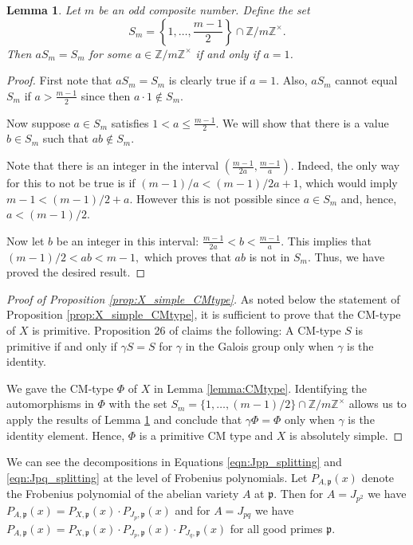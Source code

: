 \documentclass[reqno, oneside, 12pt]{amsart}
\newcommand{\Z}{\mathbb{Z}}
\newtheorem{lemma}[theorem]{Lemma}
\theoremstyle{remark}
\numberwithin{equation}{section}
\begin{document}
\begin{lemma}\label{lemma:primitive}
Let $m$ be an odd composite number. Define the set 
$$S_m=\left\{1,\ldots, \frac{m-1}{2}\right\} \cap \Z/m\Z^\times.$$
Then $aS_m=S_m$ for some $a\in\Z/m\Z^\times$ if and only if $a=1$.
\end{lemma}
\begin{proof}
First note that $aS_m=S_m$ is clearly true if $a=1$. Also, $aS_m$ cannot equal $S_m$ if $a>\frac{m-1}{2}$ since then $a\cdot 1\not\in S_m$.

Now suppose $a\in S_m$ satisfies $1<a\leq \frac{m-1}{2}$. We will show that there is a value $b\in S_m$ such that $ab\not\in S_m$. 

Note that there is an integer in the interval $\left(\frac{m-1}{2a}, \frac{m-1}{a}\right)$. Indeed, the only way for this to not be true is if $(m-1)/a < (m-1)/2a+1$, which would imply $m-1 < (m-1)/2+a$. However this is not possible since $a\in S_m$ and, hence, $a<(m-1)/2$.

Now let $b$ be an integer in this interval: $\frac{m-1}{2a}<b< \frac{m-1}{a}$. This implies that  $(m-1)/2 <ab< m-1,$
which proves that $ab$ is not in $S_m$. Thus, we have proved the desired result.


\end{proof}




\begin{proof}[Proof of Proposition \ref{prop:X_simple_CMtype}]
As noted below the statement of  Proposition \ref{prop:X_simple_CMtype}, it is sufficient to prove that the CM-type of $X$ is primitive. Proposition 26 of \cite{ShimuraTaniyama1961} claims the following: A CM-type $S$ is primitive if and only if $\gamma S=S$ for $\gamma$ in the Galois group only when $\gamma$ is the identity.

We gave the CM-type $\Phi$ of $X$ in Lemma \ref{lemma:CMtype}. Identifying the automorphisms in $\Phi$ with the set $S_m=\{1,\ldots, (m-1)/2\}\cap \Z/m\Z^\times$ allows us to apply the results of Lemma \ref{lemma:primitive} and conclude that $\gamma \Phi=\Phi$ only when $\gamma$ is the identity element. Hence, $\Phi$ is a primitive CM type and $X$ is absolutely simple. 
\end{proof}



We can see the decompositions in Equations \eqref{eqn:Jpp_splitting} and \eqref{eqn:Jpq_splitting} at the level of Frobenius polynomials. Let $P_{A,\mathfrak p}(x)$ denote the Frobenius polynomial of the abelian variety $A$ at $\mathfrak p$. Then for $A=J_{p^2}$ we have $P_{A,\mathfrak p}(x)=P_{X,\mathfrak p}(x)\cdot P_{J_p,\mathfrak p}(x)$ and for $A=J_{pq}$ we have $P_{A,\mathfrak p}(x)=P_{X,\mathfrak p}(x)\cdot P_{J_p,\mathfrak p}(x)\cdot P_{J_q,\mathfrak p}(x)$ for all good primes $\mathfrak p$.
\end{document}

